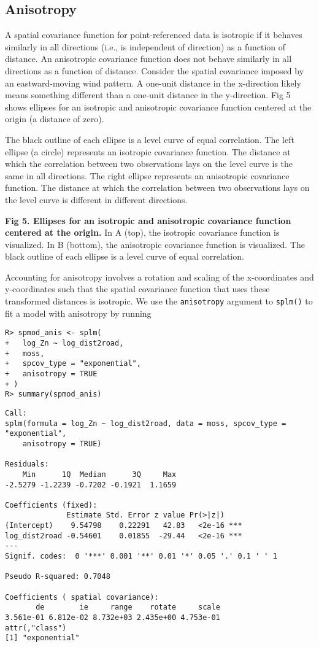 \documentclass[10pt,letterpaper]{article}
\begin{document}
\hypertarget{sec:anisotropy}{%
\subsection{Anisotropy}\label{sec:anisotropy}}

A spatial covariance function for point-referenced data is isotropic if
it behaves similarly in all directions (i.e., is independent of
direction) as a function of distance. An anisotropic covariance function
does not behave similarly in all directions as a function of distance.
Consider the spatial covariance imposed by an eastward-moving wind
pattern. A one-unit distance in the x-direction likely means something
different than a one-unit distance in the y-direction. Fig 5 shows
ellipses for an isotropic and anisotropic covariance function centered
at the origin (a distance of zero).

The black outline of each ellipse is a level curve of equal correlation.
The left ellipse (a circle) represents an isotropic covariance function.
The distance at which the correlation between two observations lays on
the level curve is the same in all directions. The right ellipse
represents an anisotropic covariance function. The distance at which the
correlation between two observations lays on the level curve is
different in different directions.

\textbf{Fig 5. Ellipses for an isotropic and anisotropic covariance
function centered at the origin.} In A (top), the isotropic covariance
function is visualized. In B (bottom), the anisotropic covariance
function is visualized. The black outline of each ellipse is a level
curve of equal correlation.

Accounting for anisotropy involves a rotation and scaling of the
x-coordinates and y-coordinates such that the spatial covariance
function that uses these transformed distances is isotropic. We use the
\texttt{anisotropy} argument to \texttt{splm()} to fit a model with
anisotropy by running

\begin{verbatim}
R> spmod_anis <- splm(
+   log_Zn ~ log_dist2road,
+   moss,
+   spcov_type = "exponential",
+   anisotropy = TRUE
+ )
R> summary(spmod_anis)
\end{verbatim}

\begin{verbatim}
Call:
splm(formula = log_Zn ~ log_dist2road, data = moss, spcov_type = "exponential", 
    anisotropy = TRUE)

Residuals:
    Min      1Q  Median      3Q     Max 
-2.5279 -1.2239 -0.7202 -0.1921  1.1659 

Coefficients (fixed):
              Estimate Std. Error z value Pr(>|z|)    
(Intercept)    9.54798    0.22291   42.83   <2e-16 ***
log_dist2road -0.54601    0.01855  -29.44   <2e-16 ***
---
Signif. codes:  0 '***' 0.001 '**' 0.01 '*' 0.05 '.' 0.1 ' ' 1

Pseudo R-squared: 0.7048

Coefficients ( spatial covariance):
       de        ie     range    rotate     scale 
3.561e-01 6.812e-02 8.732e+03 2.435e+00 4.753e-01 
attr(,"class")
[1] "exponential"
\end{verbatim}
\end{document}
